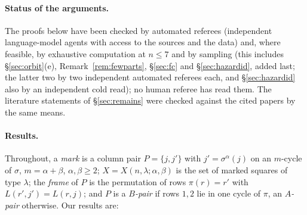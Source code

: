\documentclass[11pt]{article}
\theoremstyle{definition}
\begin{document}
\paragraph{Status of the arguments.}  The proofs below have been checked by automated
referees (independent language-model agents with access to the sources and the data) and,
where feasible, by exhaustive computation at $n\le7$ and by sampling (this includes
\S\ref{sec:orbit}(e), Remark~\ref{rem:fewparts}, \S\ref{sec:fc} and
\S\ref{sec:hazardid}, added last; the latter two by two independent automated referees
each, and \S\ref{sec:hazardid} also by an independent cold read); no human referee has
read them.  The
literature statements of \S\ref{sec:remains} were checked against the cited papers by the
same means.

\paragraph{Results.}  Throughout, a \emph{mark} is a column pair $P=\{j,j'\}$ with
$j'=\sigma^\alpha(j)$ on an $m$-cycle of $\sigma$, $m=\alpha+\beta$, $\alpha,\beta\ge2$;
$X=X(n,\lambda;\alpha,\beta)$ is the set of marked squares of type $\lambda$; the
\emph{frame} of $P$ is the permutation of rows $\pi(r)=r'$ with $L(r',j')=L(r,j)$; and
$P$ is a \emph{$B$-pair} if rows $1,2$ lie in one cycle of $\pi$, an \emph{$A$-pair}
otherwise.  Our results are:
\end{document}
